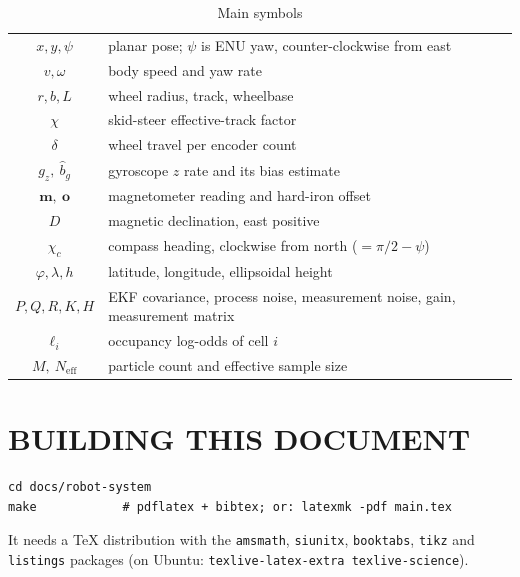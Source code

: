 \begin{table}[htbp]
\centering
\caption{Main symbols}
\small
\begin{tabular}{cl}
\toprule
$x,y,\psi$ & planar pose; $\psi$ is ENU yaw, counter-clockwise from east \\
$v,\omega$ & body speed and yaw rate \\
$r,b,L$ & wheel radius, track, wheelbase \\
$\chi$ & skid-steer effective-track factor \\
$\delta$ & wheel travel per encoder count \\
$g_z,\ \hat b_g$ & gyroscope $z$ rate and its bias estimate \\
$\bm m,\ \bm o$ & magnetometer reading and hard-iron offset \\
$D$ & magnetic declination, east positive \\
$\chi_c$ & compass heading, clockwise from north ($=\pi/2-\psi$) \\
$\varphi,\lambda,h$ & latitude, longitude, ellipsoidal height \\
$P,Q,R,K,H$ & EKF covariance, process noise, measurement noise, gain, measurement matrix \\
$\ell_i$ & occupancy log-odds of cell $i$ \\
$M,\ N_{\mathrm{eff}}$ & particle count and effective sample size \\
\bottomrule
\end{tabular}
\end{table}

\section{BUILDING THIS DOCUMENT}

\begin{lstlisting}
cd docs/robot-system
make            # pdflatex + bibtex; or: latexmk -pdf main.tex
\end{lstlisting}
It needs a TeX distribution with the \texttt{amsmath}, \texttt{siunitx},
\texttt{booktabs}, \texttt{tikz} and \texttt{listings} packages (on Ubuntu:
\texttt{texlive-latex-extra texlive-science}).
